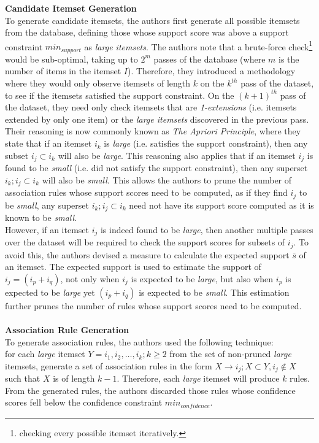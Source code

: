 \textbf{Candidate Itemset Generation}\\
To generate candidate itemsets, the authors first generate all possible itemsets from the database, defining those whose support score was above a support constraint $\textit{min}_\textit{support}$ as \textit{large itemsets}. The authors note that a brute-force check\footnote{checking every possible itemset iteratively.} would be sub-optimal, taking up to $2^m$ passes of the database (where $m$ is the number of items in the itemset $I$). Therefore, they introduced a methodology where they would only observe itemsets of length $k$ on the $k^{th}$ pass of the dataset, to see if the itemsets satisfied the support constraint. On the $(k+1)^{th}$ pass of the dataset, they need only check itemsets that are \textit{1-extensions} (i.e. itemsets extended by only one item) or the \textit{large itemsets} discovered in the previous pass. Their reasoning is now commonly known as \textit{The Apriori Principle}, where they state that if an itemset $i_k$ is \textit{large} (i.e. satisfies the support constraint), then any subset $i_j \subset i_k$ will also be \textit{large}. This reasoning also applies that if an itemset $i_j$ is found to be \textit{small} (i.e. did not satisfy the support constraint), then any superset $i_k; i_j \subset i_k$ will also be \textit{small}. This allows the authors to prune the number of association rules whose support scores need to be computed, as if they find $i_j$ to be \textit{small}, any superset $i_k; i_j \subset i_k$ need not have its support score computed as it is known to be \textit{small}.\\
However, if an itemset $i_j$ is indeed found to be \textit{large}, then another multiple passes over the dataset will be required to check the support scores for subsets of $i_j$. To avoid this, the authors devised a measure to calculate the expected support $\bar{s}$ of an itemset. The expected support is used to estimate the support of $i_j = (i_p + i_q)$, not only when $i_j$ is expected to be \textit{large}, but also when $i_p$ is expected to be \textit{large} yet $(i_p + i_q)$ is expected to be \textit{small}. This estimation further prunes the number of rules whose support scores need to be computed.
\\\\\textbf{Association Rule Generation}\\
To generate association rules, the authors used the following technique:\\
for each \textit{large} itemset $Y = i_1, i_2,\dots,i_k; k \geq 2$ from the set of non-pruned \textit{large} itemsets, generate a set of association rules in the form $X \rightarrow i_j; X \subset Y, i_j \notin X$ such that $X$ is of length $k-1$. Therefore, each \textit{large} itemset will produce $k$ rules. From the generated rules, the authors discarded those rules whose confidence scores fell below the confidence constraint $\textit{min}_\textit{confidence}$.
